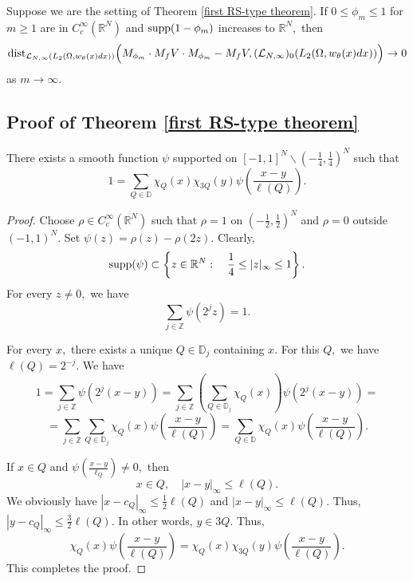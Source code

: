 \documentclass{amsart}
\begin{document}
\begin{theorem}\label{first RS-type convergence} Suppose we are the setting of Theorem \ref{first RS-type theorem}. If $0\leq\phi_m\leq 1$ for $m\geq1$ are in $C^{\infty}_c(\mathbb{R}^N)$ and ${\rm supp}(1-\phi_m)$ increases to $\mathbb{R}^N,$ then
$${\rm dist}_{\mathcal{L}_{N,\infty}(L_2(\Omega,w_{\theta}(x)dx))}\Big(M_{\phi_m}\cdot M_fV\cdot M_{\phi_m}-M_fV,(\mathcal{L}_{N,\infty})_0(L_2(\Omega,w_{\theta}(x)dx))\Big)\to0$$
as $m\to\infty.$
\end{theorem}

\subsection{Proof of Theorem \ref{first RS-type theorem}}


\begin{lemma} There exists a smooth function $\psi$ supported on $[-1,1]^N\backslash(-\frac14,\frac14)^N$ such that
$$1=\sum_{Q\in\mathbb{D}}\chi_Q(x)\chi_{3Q}(y)\psi(\frac{x-y}{\ell(Q)}).$$
\end{lemma}
\begin{proof} Choose $\rho\in C_c^{\infty}(\mathbb{R}^N)$ such that $\rho=1$ on $(-\frac12,\frac12)^N$ and $\rho=0$ outside $(-1,1)^N.$ Set $\psi(z)=\rho(z)-\rho(2z).$ Clearly,
$${\rm supp}(\psi)\subset
\left\{z\in\mathbb{R}^N:\quad 
\frac14\leq |z|_{\infty}\leq 1\right\}.$$
For every $z\neq0,$ we have
\begin{equation}\label{eq:rankone-psi-partition}
\sum_{j\in\mathbb{Z}}\psi(2^jz)=1.
\end{equation}

For every $x,$ there exists a unique $Q\in\mathbb{D}_j$ containing $x.$ For this $Q,$ we have $\ell(Q)=2^{-j}.$ We have
$$1=\sum_{j\in\mathbb{Z}}\psi(2^j(x-y))=\sum_{j\in\mathbb{Z}}(\sum_{Q\in\mathbb{D}_j}\chi_Q(x))\psi(2^j(x-y))=$$
$$=\sum_{j\in\mathbb{Z}}\sum_{Q\in\mathbb{D}_j}\chi_Q(x)\psi(\frac{x-y}{\ell(Q)})=\sum_{Q\in\mathbb{D}}\chi_Q(x)\psi(\frac{x-y}{\ell(Q)}).$$

If $x\in Q$ and $\psi(\frac{x-y}{\ell_Q})\neq 0,$ then
$$x\in Q,\quad |x-y|_{\infty}\leq\ell(Q).$$
We obviously have $|x-c_Q|_{\infty}\leq\frac12\ell(Q)$ and $|x-y|_{\infty}\leq\ell(Q).$ Thus, $|y-c_Q|_{\infty}\leq\frac32\ell(Q).$ In other words, $y\in 3Q.$ Thus,
$$\chi_Q(x)\psi(\frac{x-y}{\ell(Q)})=\chi_Q(x)\chi_{3Q}(y)\psi(\frac{x-y}{\ell(Q)}).$$
This completes the proof.
\end{proof}
\end{document}
